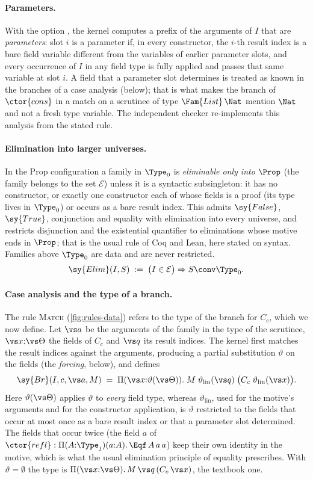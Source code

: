 \paragraph{Parameters.}
With the option , the kernel computes a prefix of the arguments of $I$ that are \emph{parameters}: slot $i$ is a parameter if, in every constructor, the $i$-th result index is a bare field variable different from the variables of earlier parameter slots, and every occurrence of $I$ in any field type is fully applied and passes that same variable at slot $i$.
A field that a parameter slot determines is treated as known in the branches of a case analysis (below); that is what makes the branch of $\ctor{cons}$ in a match on a scrutinee of type $\Fam{List}\,\Nat$ mention $\Nat$ and not a fresh type variable.
The independent checker re-implements this analysis from the stated rule.

\paragraph{Elimination into larger universes.}
In the Prop configuration a family in $\Type_0$ is \emph{eliminable only into $\Prop$} (the family belongs to the set $\mathcal E$) unless it is a syntactic subsingleton: it has no constructor, or exactly one constructor each of whose fields is a proof (its type lives in $\Type_0$) or occurs as a bare result index.
This admits $\sy{False}$, $\sy{True}$, conjunction and equality with elimination into every universe, and restricts disjunction and the existential quantifier to eliminations whose motive ends in $\Prop$; that is the usual rule of Coq and Lean, here stated on syntax.
Families above $\Type_0$ are data and are never restricted.
\[
\sy{Elim}(I,S) \;:=\; \bigl(I\in\mathcal E\bigr)\Rightarrow S \conv \Type_0 .
\]

\paragraph{Case analysis and the type of a branch.}
The rule \textsc{Match} (\cref{fig:rules-data}) refers to the type of the branch for $C_c$, which we now define.
Let $\vs a$ be the arguments of the family in the type of the scrutinee, $\vs x{:}\vs\Theta$ the fields of $C_c$ and $\vs q$ its result indices.
The kernel first matches the result indices against the arguments, producing a partial substitution $\vartheta$ on the fields (the \emph{forcing}, below), and defines
\[
\sy{Br}(I,c,\vs a,M) \;=\; \Pi(\vs x{:}\vartheta(\vs\Theta)).\; M\;\vartheta_{\mathrm{lin}}(\vs q)\;\bigl(C_c\;\vartheta_{\mathrm{lin}}(\vs x)\bigr).
\]
Here $\vartheta(\vs\Theta)$ applies $\vartheta$ to \emph{every} field type, whereas $\vartheta_{\mathrm{lin}}$, used for the motive's arguments and for the constructor application, is $\vartheta$ restricted to the fields that occur at most once as a bare result index or that a parameter slot determined.
The fields that occur twice (the field $a$ of $\ctor{refl} : \Pi(A{:}\Type_j)(a{:}A).\,\Eqf\,A\,a\,a$) keep their own identity in the motive, which is what the usual elimination principle of equality prescribes.
With $\vartheta=\emptyset$ the type is $\Pi(\vs x{:}\vs\Theta).\,M\,\vs q\,(C_c\,\vs x)$, the textbook one.

